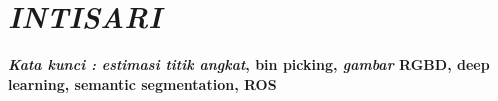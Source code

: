 \documentclass[../thesis.tex]{subfiles}
\begin{document}
\chapter*{\emph{INTISARI}}%
\normalfont
\vspace{1.0cm}
\begin{singlespacing}%
{}


\bigskip
\noindent

\textbf{\emph{Kata kunci : estimasi titik angkat}, bin picking, \emph{gambar} RGBD, deep learning, semantic segmentation, ROS}
\end{singlespacing}
\end{document}
